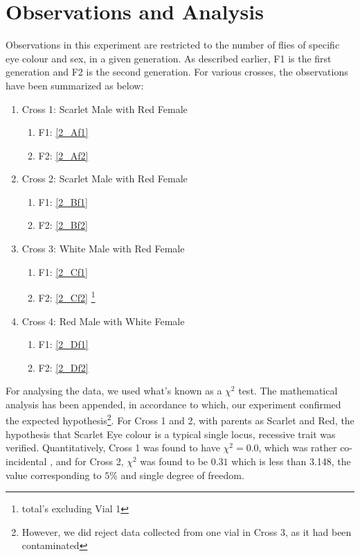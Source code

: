 \section{Observations and Analysis}
	Observations in this experiment are restricted to the number of flies of specific eye colour and sex, in a given generation. As described earlier, F1 is the first generation and F2 is the second generation. For various crosses, the observations have been summarized as below:
	\begin{enumerate}
		\item Cross 1: Scarlet Male with Red Female
			\begin{enumerate}
				\item F1: \autoref{2_Af1}
				\item F2: \autoref{2_Af2}
			\end{enumerate}
		\item Cross 2: Scarlet Male with Red Female
			\begin{enumerate}
				\item F1: \autoref{2_Bf1}
				\item F2: \autoref{2_Bf2}
			\end{enumerate}
		\item Cross 3: White Male with Red Female
			\begin{enumerate}
				\item F1: \autoref{2_Cf1}
				\item F2: \autoref{2_Cf2} \footnote{total's excluding Vial 1}
			\end{enumerate}
		\item Cross 4: Red Male with White Female
			\begin{enumerate}
				\item F1: \autoref{2_Df1}
				\item F2: \autoref{2_Df2}
			\end{enumerate}
	\end{enumerate}
	For analysing the data, we used what's known as a $\chi^{2}$ test. The mathematical analysis has been appended, in accordance to which, our experiment confirmed the expected hypothesis\footnote{However, we did reject data collected from one vial in Cross 3, as it had been contaminated}. For Cross 1 and 2, with parents as Scarlet and Red, the hypothesis that Scarlet Eye colour is a typical single locus, recessive trait was verified. Quantitatively, Cross 1 was found to have $\chi^{2}=0.0$, which was rather co-incidental , and for Cross 2, $\chi^{2}$ was found to be $0.31$ which is less than 3.148, the value corresponding to $5\%$ and single degree of freedom.\\
